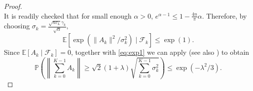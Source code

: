 \documentclass[11pt,reqno]{amsart}
\newcommand{\1}{{\bf 1}}
\newcommand{\2}{{\bf 2}}
\newcommand{\E}{\mathbb E}
\newcommand{\cf}{\mathcal F}
\newcommand{\al}{\alpha}
\numberwithin{equation}{section}
\theoremstyle{remark}
\begin{document}
{\begin{proof}
\begin{equation*}
		\end{equation*}
		It is readily checked that for small enough $\al > 0$, $e^{\al-1} \leq1-\frac{4n}{\pi}\al$. Therefore, by choosing $\sigma_k=\frac{\sqrt{nc_L}\gamma_k}{\sqrt{\al}},$ 
		\begin{equation}\label{eq:exp1}
			\E \left[ \exp\left({\|A_k\|^2/\sigma_k^2}\right) \mid \cf_k \right]\leq \exp(1).
		\end{equation}
		Since $\mathbb{E}\left[A_k \mid \mathcal{F}_{k}\right]=0$, together with \eqref{eq:exp1} we can apply \cite[Lem 2.3]{ghadimi2013stochastic} (see also \cite[Thm 2.1]{juditsky2008large}) to obtain
		\begin{equation}\label{eq:pbAk}
			\mathbb{P}\left(\left\|\sum_{k=0}^{K-1}A_k\right\| \geq \sqrt{2}(1+\lambda) \sqrt{\sum_{k=0}^{K-1} \sigma_k^2}\right)\leq \exp\left(-\lambda^2/3\right).
		\end{equation}
		

\end{proof}}
\end{document}
